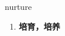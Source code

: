 
\begin{frame}
{\huge nurture}
\begin{center}
\begin{enumerate}\Large
  \item \textbf{培育，培养}
\end{enumerate}
\end{center}
\end{frame}
